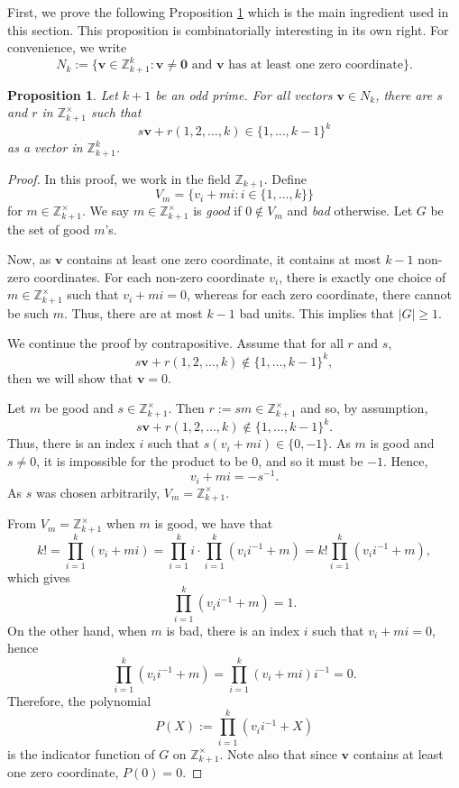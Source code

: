 \documentclass[11pt]{amsart}
\newcommand{\Unit}[1]{\Z_{#1}^\times}
\newcommand{\Z}{\mathbb{Z}}
\newcommand{\vbf}{\mathbf{v}}
\newcommand{\onetok}{(1, 2, \dots, k)}
\newtheorem{proposition}[theorem]{Proposition}
\theoremstyle{definition}
\theoremstyle{remark}
\begin{document}
First, we prove the following Proposition \ref{prop:polynomial} which is the main ingredient used in this section.
This proposition is combinatorially interesting in its own right.
For convenience, we write 
\[ N_{k} := \{ \vbf \in \Z_{k+1}^k : \vbf \ne \mathbf0 \text{ and } \vbf \text{ has at least one zero coordinate}\}. \]
\begin{proposition}
\label{prop:polynomial}
    Let $k+1$ be an odd prime. For all vectors $\vbf \in N_k$,
    there are $s$ and $r$ in $\Unit{k+1}$ such that
    \[s\vbf + r\onetok  \in  \{1,\ldots,k-1\}^k\] as a vector in $\mathbb{Z}_{k+1}^k$.
\end{proposition}
\begin{proof}
    In this proof, we work in the field $\Z_{k+1}$.
    Define \[V_m = \{v_i+mi:i\in \{1,\ldots,k\} \}\] for $m \in \Unit{k+1}$.
    We say $m\in \Unit{k+1}$ is \emph{good} if $0 \notin V_m$ and \emph{bad} otherwise. 
    Let $G$ be the set of good $m$'s.

    Now, as $\vbf$ contains at least one zero coordinate, it contains at most $k-1$ non-zero coordinates.
    For each non-zero coordinate $v_i$, there is exactly one choice of $m\in\Unit{k+1}$ such that $v_i + m i = 0$, 
    whereas for each zero coordinate, there cannot be such $m$. 
    Thus, there are at most $k-1$ bad units.
    This implies that $|G| \ge 1$.

    We continue the proof by contrapositive. Assume that for all $r$ and $s$, 
    \[s\vbf + r\onetok  \notin  \{1,\ldots,k-1\}^k,\] then we will show that $\vbf = 0$.

    Let $m$ be good and $s\in\Unit{k+1}$. Then $r:=sm\in\Unit{k+1}$ and so, by assumption,
    \[ s\vbf + r\onetok \not\in \{1, \dots, k-1\}^k. \]
    Thus, there is an index $i$ such that $s (v_i + m i) \in \{0, -1\}$.
    As $m$ is good and $s\neq0$, it is impossible for the product to be $0$, and so it must be $-1$. Hence, 
    \[ v_i + m i = -s^{-1}. \]
    As $s$ was chosen arbitrarily, $V_m = \Unit{k+1}$.

    From $V_m = \Unit{k+1}$ when $m$ is good, we have that
    \[k! = \prod_{i=1}^k(v_i+mi) = \prod_{i=1}^k i \cdot \prod_{i=1}^k (v_i i^{-1} + m) = k!\prod_{i=1}^k (v_i i^{-1}+m),\]
    which gives \[\prod_{i=1}^k (v_i i^{-1} + m) = 1.\]
    On the other hand, when $m$ is bad, there is an index $i$ such that $v_i + m i = 0$, hence 
    \[ \prod_{i=1}^k (v_i i^{-1} + m) = \prod_{i=1}^k (v_i + m i) i^{-1} = 0. \]
    Therefore, the polynomial \[ P(X) := \prod_{i=1}^k (v_ii^{-1}+X) \] is the indicator function of $G$ on $\Unit{k+1}$.
    Note also that since $\vbf$ contains at least one zero coordinate, $P(0) = 0$.


\end{proof}
\end{document}
